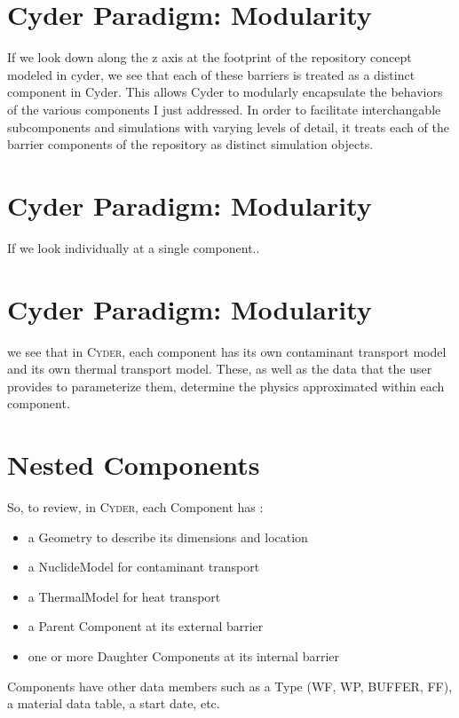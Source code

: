 \documentclass[letterpaper]{article}
\newcommand{\Cyder}{\textsc{Cyder}\xspace}
\begin{document}
\section{Cyder Paradigm: Modularity}

If we look down along the z axis at the footprint of the repository concept 
modeled in cyder, we see that each of these barriers is treated as a distinct 
component in Cyder. This allows Cyder to modularly encapsulate the behaviors of 
the various components I just addressed. In order to facilitate interchangable 
subcomponents and simulations with varying levels of detail, it treats each of 
the barrier components of the repository as distinct simulation objects. 


\section{Cyder Paradigm: Modularity}

If we look individually at a single component..

\section{Cyder Paradigm: Modularity}

we see that in \Cyder , each component has its own contaminant transport model 
and its own thermal transport model. These, as well as the data that the user 
provides to parameterize them, determine the physics approximated within each 
component. 

\section{Nested Components}
So, to review, in \Cyder , each Component has : 
  \begin{itemize}
    \item a Geometry to describe its dimensions and location
    \item a NuclideModel for contaminant transport 
    \item a ThermalModel for heat transport
    \item a Parent Component at its external barrier
    \item one or more Daughter Components at its internal barrier
  \end{itemize}

  Components have other data members such as a Type (WF, WP, BUFFER, FF), a 
  material data table, a start date, etc. 
\end{document}
